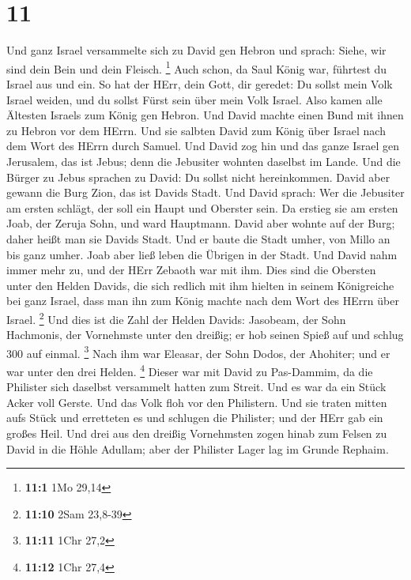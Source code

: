 \hypertarget{section-10}{%
\section{11}\label{section-10}}

 Und ganz Israel versammelte sich zu David gen Hebron und
sprach: Siehe, wir sind dein Bein und dein Fleisch. \footnote{\textbf{11:1}
  1Mo 29,14}  Auch schon, da Saul König war, führtest du
Israel aus und ein. So hat der HErr, dein Gott, dir geredet: Du sollst
mein Volk Israel weiden, und du sollst Fürst sein über mein Volk Israel.
 Also kamen alle Ältesten Israels zum König gen Hebron.
Und David machte einen Bund mit ihnen zu Hebron vor dem HErrn. Und sie
salbten David zum König über Israel nach dem Wort des HErrn durch
Samuel.  Und David zog hin und das ganze Israel gen
Jerusalem, das ist Jebus; denn die Jebusiter wohnten daselbst im Lande.
 Und die Bürger zu Jebus sprachen zu David: Du sollst
nicht hereinkommen. David aber gewann die Burg Zion, das ist Davids
Stadt.  Und David sprach: Wer die Jebusiter am ersten
schlägt, der soll ein Haupt und Oberster sein. Da erstieg sie am ersten
Joab, der Zeruja Sohn, und ward Hauptmann.  David aber
wohnte auf der Burg; daher heißt man sie Davids Stadt. 
Und er baute die Stadt umher, von Millo an bis ganz umher. Joab aber
ließ leben die Übrigen in der Stadt.  Und David nahm immer
mehr zu, und der HErr Zebaoth war mit ihm.  Dies sind die
Obersten unter den Helden Davids, die sich redlich mit ihm hielten in
seinem Königreiche bei ganz Israel, dass man ihn zum König machte nach
dem Wort des HErrn über Israel. \footnote{\textbf{11:10} 2Sam 23,8-39}
 Und dies ist die Zahl der Helden Davids: Jasobeam, der
Sohn Hachmonis, der Vornehmste unter den dreißig; er hob seinen Spieß
auf und schlug 300 auf einmal. \footnote{\textbf{11:11} 1Chr 27,2}
 Nach ihm war Eleasar, der Sohn Dodos, der Ahohiter; und
er war unter den drei Helden. \footnote{\textbf{11:12} 1Chr 27,4}
 Dieser war mit David zu Pas-Dammim, da die Philister
sich daselbst versammelt hatten zum Streit. Und es war da ein Stück
Acker voll Gerste. Und das Volk floh vor den Philistern. 
Und sie traten mitten aufs Stück und erretteten es und schlugen die
Philister; und der HErr gab ein großes Heil.  Und drei
aus den dreißig Vornehmsten zogen hinab zum Felsen zu David in die Höhle
Adullam; aber der Philister Lager lag im Grunde Rephaim. 
